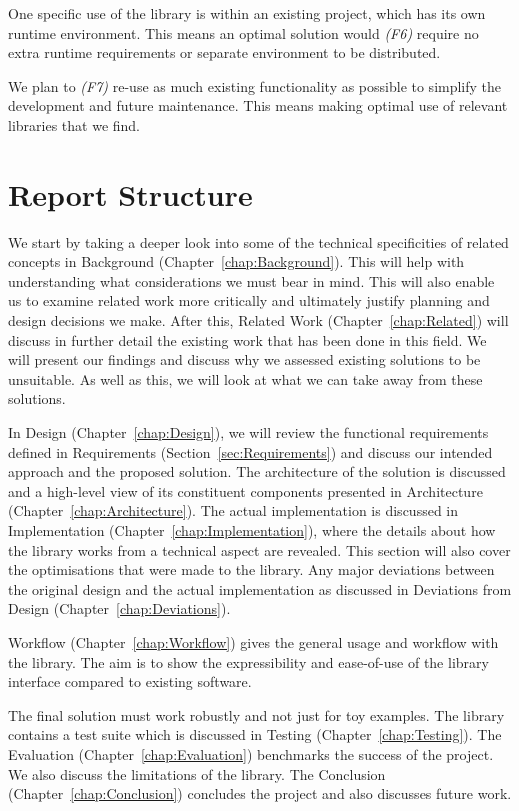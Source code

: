 One specific use of the library is within an existing project, which has its own runtime environment. This means an optimal solution would \emph{(F6)} require no extra runtime requirements or separate environment to be distributed.

We plan to \emph{(F7)} re-use as much existing functionality as possible to simplify the development and future maintenance. This means making optimal use of relevant libraries that we find.

\section{Report Structure}

We start by taking a deeper look into some of the technical specificities of related concepts in Background (Chapter~\ref{chap:Background}). This will help with understanding what considerations we must bear in mind. This will also enable us to examine related work more critically and ultimately justify planning and design decisions we make. After this, Related Work (Chapter~\ref{chap:Related}) will discuss in further detail the existing work that has been done in this field. We will present our findings and discuss why we assessed existing solutions to be unsuitable. As well as this, we will look at what we can take away from these solutions.

In Design (Chapter~\ref{chap:Design}), we will review the functional requirements defined in Requirements (Section~\ref{sec:Requirements}) and discuss our intended approach and the proposed solution. The architecture of the solution is discussed and a high-level view of its constituent components presented in Architecture (Chapter~\ref{chap:Architecture}). The actual implementation is discussed in Implementation (Chapter~\ref{chap:Implementation}), where the details about how the library works from a technical aspect are revealed. This section will also cover the optimisations that were made to the library. Any major deviations between the original design and the actual implementation as discussed in Deviations from Design (Chapter~\ref{chap:Deviations}).

Workflow (Chapter~\ref{chap:Workflow}) gives the general usage and workflow with the library. The aim is to show the expressibility and ease-of-use of the library interface compared to existing software.

The final solution must work robustly and not just for toy examples. The library contains a test suite which is discussed in Testing (Chapter~\ref{chap:Testing}). The Evaluation (Chapter~\ref{chap:Evaluation}) benchmarks the success of the project. We also discuss the limitations of the library. The Conclusion (Chapter~\ref{chap:Conclusion}) concludes the project and also discusses future work.